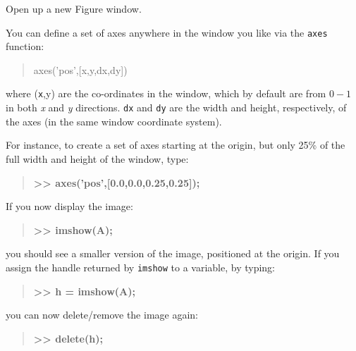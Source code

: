 \documentclass{tufte-book} %
\newenvironment{docspec}{\begin{quotation}\ttfamily\parskip0pt\parindent0pt\ignorespaces}{\end{quotation}}
\newenvironment{docspecbold}{\begin{quotation}\ttfamily\bfseries\parskip0pt\parindent0pt\ignorespaces}{\end{quotation}}
\begin{document}
Open up a new \textsf{Figure window}.

You can define a set of axes anywhere in the window you like via the \texttt{axes} function:
\begin{docspec}
axes('pos',[x,y,dx,dy])
\end{docspec}
where (\texttt{x},y) are the co-ordinates in the window, which by default are from \(0-1\) in both \textit{x} and \textit{y} directions. \texttt{dx} and \texttt{dy} are the width and height, respectively, of the axes (in the same window coordinate system).

For instance, to create a set of axes starting at the origin, but only 25\% of the full width and height of the window, type:
\begin{docspecbold}
>> axes('pos',[0.0,0.0,0.25,0.25]);
\end{docspecbold}
If you now display the image:
\begin{docspecbold}
>> imshow(A);
\end{docspecbold}
 you should see a smaller version of the image, positioned at the origin. If you assign the handle returned by \texttt{imshow} to a variable, by typing:
\begin{docspecbold}
>> h = imshow(A);
\end{docspecbold}
you can now delete/remove the image again:
\begin{docspecbold}
>> delete(h);
\end{docspecbold}
\end{document}
